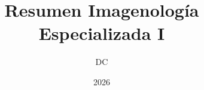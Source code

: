 \documentclass[12pt, a4paper]{report}
\begin{document}

\title{\textbf{\color{azulprincipal} Resumen Imagenología Especializada I}}
\author{DC}
\date{2026}

\maketitle
\tableofcontents
\newpage








\end{document}
